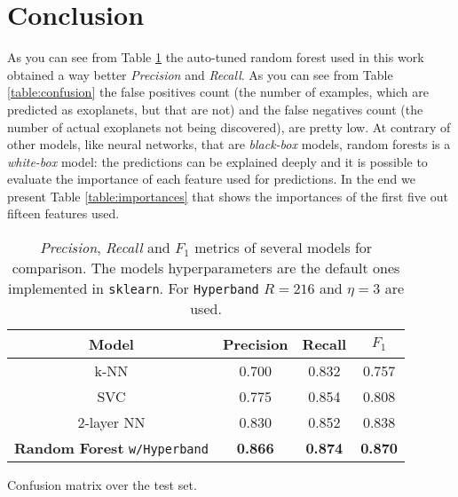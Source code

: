 \documentclass[11pt, a4paper]{article}
\begin{document}
\section{Conclusion}
  As you can see from Table \ref{table:benchmark} the auto-tuned random forest used in this work obtained a way better \textit{Precision} and \textit{Recall}. As you can see from Table \ref{table:confusion} the false positives count (the number of examples, which are predicted as exoplanets, but that are not) and the false negatives count (the number of actual exoplanets not being discovered), are pretty low. At contrary of other models, like neural networks, that are \textit{black-box} models, random forests is a \textit{white-box} model: the predictions can be explained deeply and it is possible to evaluate the importance of each feature used for predictions. In the end we present Table \ref{table:importances} that shows the importances of the first five out fifteen features used.

  \begin{table}
    \centering
    \begin{tabular}{|c c c c|}
      \hline
      Model & Precision & Recall & $F_{1}$  \\
      \hline\hline
      k-NN & 0.700 & 0.832 & 0.757 \\
      \hline
      SVC & 0.775& 0.854 & 0.808 \\
      \hline
      2-layer NN & 0.830 & 0.852 & 0.838 \\
      \hline
      \textbf{Random Forest} \texttt{w/Hyperband} & \textbf{0.866} & \textbf{0.874} & \textbf{0.870} \\
      \hline
    \end{tabular}
    \caption{\textit{Precision}, \textit{Recall} and $F_{1}$ metrics of several models for comparison. The models hyperparameters are the default ones implemented in \texttt{sklearn}. For \texttt{Hyperband} $R=216$ and $\eta=3$ are used.}
    \label{table:benchmark}
  \end{table}
  
  \begin{table}
    \centering
    \caption{Confusion matrix over the test set.}
    \label{table:confusion}
  \end{table}
\end{document}
